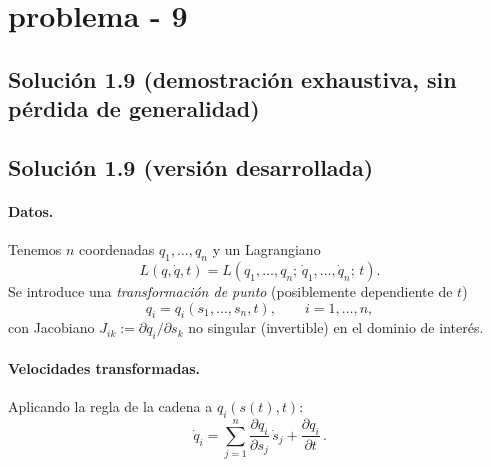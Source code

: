\section{problema - 9} \vspace{0.5cm}


\subsection*{Solución 1.9 (demostración exhaustiva, sin pérdida de generalidad)}


\subsection*{Solución 1.9 (versión desarrollada)}

\paragraph{Datos.}
Tenemos $n$ coordenadas $q_1,\dots,q_n$ y un Lagrangiano
\[
L(q,\dot q,t)=L(q_1,\ldots,q_n;\,\dot q_1,\ldots,\dot q_n;\,t).
\]
Se introduce una \emph{transformación de punto} (posiblemente dependiente de $t$)
\begin{equation}
\label{T}
q_i=q_i(s_1,\ldots,s_n,t),\qquad i=1,\ldots,n,
\end{equation}
con Jacobiano $J_{ik}:=\partial q_i/\partial s_k$ no singular (invertible) en el dominio de interés.

\paragraph{Velocidades transformadas.}
Aplicando la regla de la cadena a $q_i(s(t),t)$:
\begin{equation}
\label{qd}
\dot q_i=\sum_{j=1}^n \frac{\partial q_i}{\partial s_j}\,\dot s_j
+\frac{\partial q_i}{\partial t}\,.
\end{equation}

